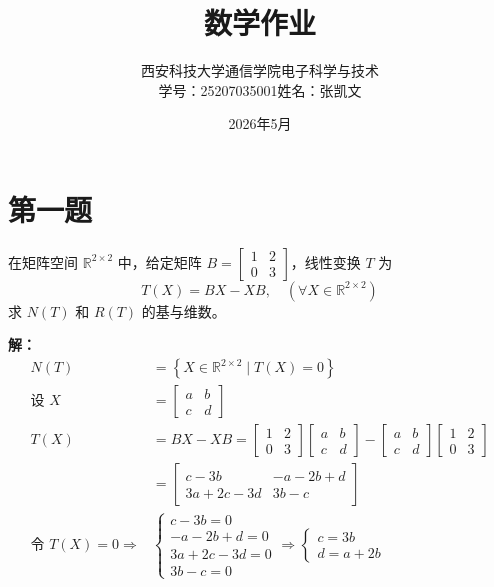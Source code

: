\documentclass{article}
\title{\bfseries{\huge{数学作业}}}
\author{西安科技大学\hspace{1em}通信学院\hspace{1em}电子科学与技术 \\
学号：25207035001\hspace{1em}姓名：张凯文}
\date{2026年5月}
\begin{document}
\maketitle

\newpage
\section{第一题}\noindent
在矩阵空间 $\mathbb{R}^{2\times2}$ 中，给定矩阵 $B = \begin{bmatrix} 
1 & 2 \\
0 & 3
\end{bmatrix}$，线性变换 $T$ 为
\[
T(X)=BX-XB,\quad(\forall X \in \mathbb{R}^{2\times2})
\]
求 $N(T)$ 和 $R(T)$ 的基与维数。

\textbf{解：}
\begin{align*}
N(T) &= \left\{ X \in \mathbb{R}^{2\times2} \mid T(X)=0 \right\} \\
\text{设 } X &= \begin{bmatrix} a & b \\ c & d \end{bmatrix} \\
T(X) &= BX - XB = 
\begin{bmatrix} 1 & 2 \\ 0 & 3 \end{bmatrix}
\begin{bmatrix} a & b \\ c & d \end{bmatrix} -
\begin{bmatrix} a & b \\ c & d \end{bmatrix}
\begin{bmatrix} 1 & 2 \\ 0 & 3 \end{bmatrix} \\
&= \begin{bmatrix} c-3b & -a-2b+d \\ 3a+2c-3d & 3b-c \end{bmatrix} \\
\text{令 } T(X)=0 \Rightarrow &
\begin{cases}
c-3b = 0 \\
-a-2b+d = 0 \\
3a+2c-3d = 0 \\
3b-c = 0
\end{cases}
\Rightarrow
\begin{cases}
c = 3b \\
d = a+2b
\end{cases} \\

\end{align*}
\end{document}
